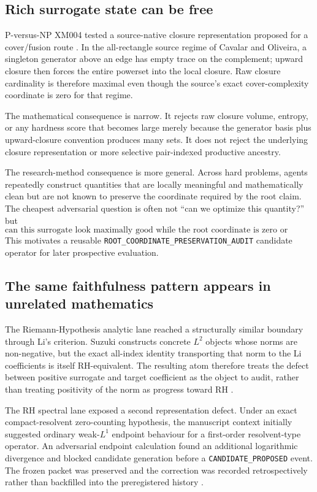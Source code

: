 \subsection{Rich surrogate state can be free}

P-versus-NP XM004 tested a source-native closure representation proposed for a cover/fusion route \cite{raklmath_xm004,cavalar2025cover}. In the all-rectangle source regime of Cavalar and Oliveira, a singleton generator above an edge has empty trace on the complement; upward closure then forces the entire powerset into the local closure. Raw closure cardinality is therefore maximal even though the source's exact cover-complexity coordinate is zero for that regime.

The mathematical consequence is narrow. It rejects raw closure volume, entropy, or any hardness score that becomes large merely because the generator basis plus upward-closure convention produces many sets. It does not reject the underlying closure representation or more selective pair-indexed productive ancestry.

The research-method consequence is more general. Across hard problems, agents repeatedly construct quantities that are locally meaningful and mathematically clean but are not known to preserve the coordinate required by the root claim. The cheapest adversarial question is often not ``can we optimize this quantity?'' but
\[
\text{can this surrogate look maximally good while the root coordinate is zero or wrong?}
\]
This motivates a reusable \texttt{ROOT\_COORDINATE\_PRESERVATION\_AUDIT} candidate operator for later prospective evaluation.

\subsection{The same faithfulness pattern appears in unrelated mathematics}

The Riemann-Hypothesis analytic lane reached a structurally similar boundary through Li's criterion. Suzuki constructs concrete $L^2$ objects whose norms are non-negative, but the exact all-index identity transporting that norm to the Li coefficients is itself RH-equivalent. The resulting atom therefore treats the defect between positive surrogate and target coefficient as the object to audit, rather than treating positivity of the norm as progress toward RH \cite{raklmath_rh_ana002,suzuki2023li}.

The RH spectral lane exposed a second representation defect. Under an exact compact-resolvent zero-counting hypothesis, the manuscript context initially suggested ordinary weak-$L^1$ endpoint behaviour for a first-order resolvent-type operator. An adversarial endpoint calculation found an additional logarithmic divergence and blocked candidate generation before a \texttt{CANDIDATE\_PROPOSED} event. The frozen packet was preserved and the correction was recorded retrospectively rather than backfilled into the preregistered history \cite{raklmath_rh_spec003}.

